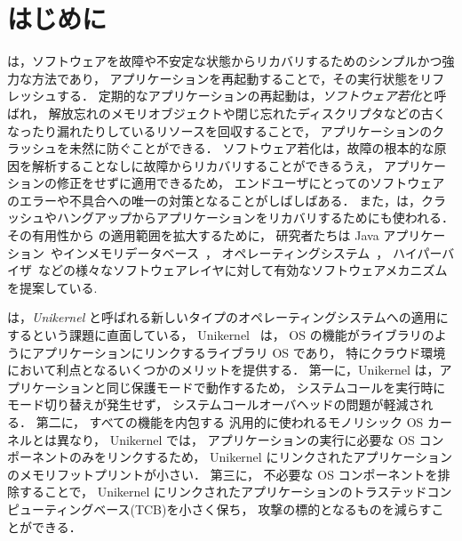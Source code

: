 \section{はじめに} \label{section:introduction}

\rr は，ソフトウェアを故障や不安定な状態からリカバリするためのシンプルかつ強力な方法であり，
アプリケーションを再起動することで，その実行状態をリフレッシュする．
定期的なアプリケーションの再起動は，\emph{ソフトウェア若化}と呼ばれ，
解放忘れのメモリオブジェクトや閉じ忘れたディスクリプタなどの古くなったり漏れたりしているリソースを回収することで，
アプリケーションのクラッシュを未然に防ぐことができる．
ソフトウェア若化は，故障の根本的な原因を解析することなしに故障からリカバリすることができるうえ，
アプリケーションの修正をせずに適用できるため，
エンドユーザにとってのソフトウェアのエラーや不具合への唯一の対策となることがしばしばある．
また，\rr は，クラッシュやハングアップからアプリケーションをリカバリするためにも使われる．
その有用性から \rr の適用範囲を拡大するために，
研究者たちは Java アプリケーション~\cite{CandeaEtAl-Microreboot}やインメモリデータベース~\cite{JumonjiEtAl-WoSAR17,JumonjiEtAl-IEICE2021}，
オペレーティングシステム~\cite{YamakitaEtAl-PBR,DepoutovitchEtAl-otherworld,KouraiEtAl-cachemind,TeradaEtAl-Dwarf,BovenziEtAl-ISSRE13}，
ハイパーバイザ~\cite{KouraiEtAl-Roothammer,KouraiEtAl-TDSC,LeEtAl-VEE11}などの様々なソフトウェアレイヤに対して有効なソフトウェアメカニズムを提案している.

\rr は，\emph{Unikernel} と呼ばれる新しいタイプのオペレーティングシステムへの適用にするという課題に直面している，
Unikernel ~\cite{MadhavapeddyEtAl-Unikernel,KivityEtAl-OSv,SartakovEtAl-ASPLOS21,KanteeEtAl-rumprun,KuenzerEtAl-Unikraft}は，
OS の機能がライブラリのようにアプリケーションにリンクするライブラリ OS であり，
特にクラウド環境において利点となるいくつかのメリットを提供する．
第一に，Unikernel は，アプリケーションと同じ保護モードで動作するため，
システムコールを実行時にモード切り替えが発生せず，
システムコールオーバヘッドの問題が軽減される．
第二に，
すべての機能を内包する
汎用的に使われるモノリシック OS カーネルとは異なり，
Unikernel では，
アプリケーションの実行に必要な OS コンポーネントのみをリンクするため，
Unikernel にリンクされたアプリケーションのメモリフットプリントが小さい．
第三に，
不必要な OS コンポーネントを排除することで，
Unikernel にリンクされたアプリケーションのトラステッドコンピューティングベース(TCB)を小さく保ち，
攻撃の標的となるものを減らすことができる．

